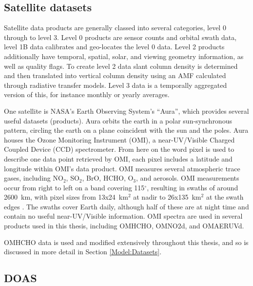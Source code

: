  
  \subsection{Satellite datasets}
    \label{Model:Meas:Satellite}
    
    Satellite data products are generally classed into several categories, level 0 through to level 3. Level 0 products are sensor counts and orbital swath data, level 1B data calibrates and geo-locates the level 0 data. 
    Level 2 products additionally have temporal, spatial, solar, and viewing geometry information, as well as quality flags.
    To create level 2 data slant column density is determined and then translated into vertical column density using an AMF calculated through radiative transfer models. 
    Level 3 data is a temporally aggregated version of this, for instance monthly or yearly averages.
    
    One satellite is NASA's Earth Observing System's ``Aura'', which provides several useful datasets (products).
    Aura orbits the earth in a polar sun-synchronous pattern, circling the earth on a plane coincident with the sun and the poles.
    Aura houses the Ozone Monitoring Instrument (OMI), a near-UV/Visible Charged Coupled Device (CCD) spectrometer.
    From here on the word pixel is used to describe one data point retrieved by OMI, each pixel includes a latitude and longitude within OMI's data product.
    OMI measures several atmospheric trace gases, including NO$_2$, SO$_2$, BrO, HCHO, O$_3$, and aerosols.
    OMI measurements occur from right to left on a band covering 115$^{\circ}$, resulting in swaths of around 2600~km, with pixel sizes from 13x24~km$^2$ at nadir to 26x135~km$^2$ at the swath edges \parencite{Abad2015}.
    The swaths cover Earth daily, although half of these are at night time and contain no useful near-UV/Visible information.
    OMI spectra are used in several products used in this thesis, including OMHCHO, OMNO2d, and OMAERUVd.
    
    OMHCHO data is used and modified extensively throughout this thesis, and so is discussed in more detail in Section \ref{Model:Datasets}.
  
  
  \subsection{DOAS}
    \label{Model:Meas:DOAS}
    
